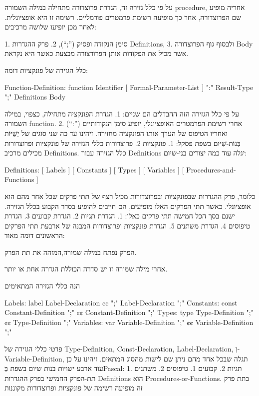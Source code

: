       על פי כלל גזירה זה, הגדרת פרוצדורה מתחילה במילה השמורה procedure, אחריה מופיע שם הפרוצדורה, אחר כך מופיעה רשימת פרמטרים פורמליים. רשימה זו היא אופציונלית. לאחר מכן יופיעו שלושה מרכיבים:

      1. סימן הנקודה ופסיק (”;“),
      2. פרק ההגדרות Definitions,
      3. ולבסוף גוף הפרוצדורה Body אשר מכיל את הפקודות אותן הפרודצורה מבצעת כאשר היא נקראת.

      כלל הגזירה של פונקציות דומה:

      Function-Definition:
      function Identifier [ Formal-Parameter-List ] ":" Result-Type ";" Definitions Body

      על פי כלל הגזירה הזה ההבדלים הם שניים:
      1. הגדרת הפונקציה מתחילה, כצפוי, במילה השמורה function.
      2. אחרי רשימת הפרמטרים האופציונלי, יופיע סימן הנקודותיים (”:“) ואחריו הטיפוס של הערך אותו הפונקציה מחזירה.
      זיהינו עד כה שני סוגים של יֵשֻׁיּוֹת בְּנוֹת-שִׁיּוּם בשפת פסקל:
      1. פונקציות
      2. פרוצדורות
      כללי הגזירה של פונקציות ופרוצדורות מכילים מרכיב Definitions. כלל הגזירה עבור Definitions יגלה עוד כמה יצורים בני-שיום:

      Definitions:
      [ Labels ] [ Constants ] [ Types ] [ Variables ] [ Procedures-and-Functions ]

      כלומר, פרק ההגדרות שבפונקציות ובפרוצדורות מכיל רצף של תתי פרקים שכל אחד מהם הוא אופציונלי. כאשר תתי הפרקים האלו מופיעים, הם חייבים להופיע בסדר הקבוע בכלל הגזירה.
      ישנם בסך הכל חמישה תתי פרקים כאלו:
      1. הגדרת תגיות
      2. הגדרת קבועים
      3. הגדרת טיפוסים
      4. הגדרת משתנים
      5. הגדרת פונקציות ופרוצדורות
      המבנה של ארבעת תתי הפרקים הראשונים דומה מאוד:
      \begin{ציינון}
\item הפרק נפתח במילה שמורה,המזהה את תת הפרק.
\item אחרי מילה שמורה זו יש סדרה הכוללת הגדרה אחת או יותר.
    \end{ציינון}

      הנה כללי הגזירה המתאימים

      Labels:
      label Label-Declaration {¢¢ ";" Label-Declaration } ";"
      Constants:
      const Constant-Definition ";" {¢¢ Constant-Definition ";" }
      Types:
      type Type-Definition ";" {¢¢ Type-Definition ";" }
      Variables:
      var Variable-Definition ";" {¢¢ Variable-Definition ";" }

      פרטי כללי הגזירה של Type-Definition, Const-Declaration, Label-Declaration, וְ-Variable-Definition, תגלה שבכל אחד מהם ניתן שם לישות מהסוג המתאים. זיהינו על כן עוד ארבע ישויות בנות שיום בשפת בְּPascal:
      1. תגיות
      2. קבועים
      1. טיפוסים
      2. משתנים
      תת-הפרק החמישי בפרק ההגדרות Definitions הוא Procedures-or-Functions. בתת פרק זה מופיעה רשימה של פונקציות ופרוצדורות מקוננות

